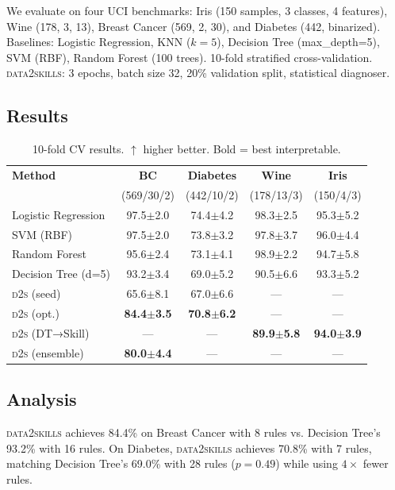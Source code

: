 \documentclass{article}
\begin{document}
We evaluate on four UCI benchmarks: Iris (150 samples, 3 classes, 4 features), Wine (178, 3, 13), Breast Cancer (569, 2, 30), and Diabetes (442, binarized). Baselines: Logistic Regression, KNN ($k=5$), Decision Tree (max\_depth=5), SVM (RBF), Random Forest (100 trees). 10-fold stratified cross-validation. \textsc{data2skills}: 3 epochs, batch size 32, 20\% validation split, statistical diagnoser.

\subsection{Results}

\begin{table}[h]
\centering
\caption{10-fold CV results. $\uparrow$ higher better. Bold = best interpretable.}
\label{tab:results}
\begin{tabular}{lcccc}
\toprule
\textbf{Method} & \textbf{BC} & \textbf{Diabetes} & \textbf{Wine} & \textbf{Iris} \\
 & (569/30/2) & (442/10/2) & (178/13/3) & (150/4/3) \\
\midrule
Logistic Regression & 97.5$\pm$2.0 & 74.4$\pm$4.2 & 98.3$\pm$2.5 & 95.3$\pm$5.2 \\
SVM (RBF) & 97.5$\pm$2.0 & 73.8$\pm$3.2 & 97.8$\pm$3.7 & 96.0$\pm$4.4 \\
Random Forest & 95.6$\pm$2.4 & 73.1$\pm$4.1 & 98.9$\pm$2.2 & 94.7$\pm$5.8 \\
Decision Tree (d=5) & 93.2$\pm$3.4 & 69.0$\pm$5.2 & 90.5$\pm$6.6 & 93.3$\pm$5.2 \\
\midrule
\textsc{d2s} (seed) & 65.6$\pm$8.1 & 67.0$\pm$6.6 & — & — \\
\textsc{d2s} (opt.) & \textbf{84.4$\pm$3.5} & \textbf{70.8$\pm$6.2} & — & — \\
\textsc{d2s} (DT→Skill) & — & — & \textbf{89.9$\pm$5.8} & \textbf{94.0$\pm$3.9} \\
\textsc{d2s} (ensemble) & \textbf{80.0$\pm$4.4} & — & — & — \\
\bottomrule
\end{tabular}
\end{table}

\subsection{Analysis}

\textsc{data2skills} achieves 84.4\% on Breast Cancer with 8 rules vs. Decision Tree's 93.2\% with 16 rules. On Diabetes, \textsc{data2skills} achieves 70.8\% with 7 rules, matching Decision Tree's 69.0\% with 28 rules ($p=0.49$) while using $4\times$ fewer rules.
\end{document}
